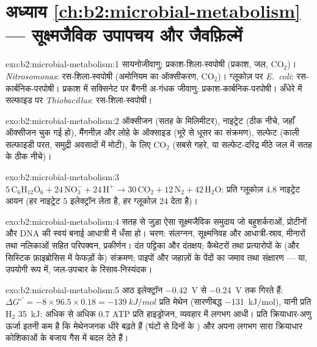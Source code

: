 \section*{अध्याय \ref{ch:b2:microbial-metabolism} --- सूक्ष्मजैविक उपापचय और जैवफ़िल्में}

\begin{solution}{exo:b2:microbial-metabolism:1}
\begingroup\sloppy
सायनोजीवाणु: प्रकाश-शिला-स्वपोषी (प्रकाश, जल, $\mathrm{CO_2}$)।
\emph{Nitrosomonas}: रस-शिला-स्वपोषी (अमोनियम का ऑक्सीकरण,
$\mathrm{CO_2}$)। ग्लूकोज़ पर \emph{E.~coli}: रस-कार्बनिक-परपोषी।
प्रकाश में सक्सिनेट पर बैंगनी अ-गंधक जीवाणु:
प्रकाश-कार्बनिक-परपोषी। अँधेरे में सल्फाइड पर \emph{Thiobacillus}:
रस-शिला-स्वपोषी।
\par\endgroup
\end{solution}

\begin{solution}{exo:b2:microbial-metabolism:2}
ऑक्सीजन (सतह के मिलिमीटर), नाइट्रेट (ठीक नीचे, जहाँ ऑक्सीजन चुक गई
हो), मैंगनीज़ और लोहे के ऑक्साइड (भूरे से धूसर का संक्रमण), सल्फेट
(काली सल्फाइडी परत, समुद्री अवसादों में मोटी),  के लिए
$\mathrm{CO_2}$ (सबसे गहरे, या सल्फेट-दरिद्र मीठे जल में सतह के ठीक
नीचे)।
\end{solution}

\begin{solution}{exo:b2:microbial-metabolism:3}
$5\,\mathrm{C_6H_{12}O_6} + 24\,\mathrm{NO_3^-} + 24\,\mathrm{H^+}
\to 30\,\mathrm{CO_2} + 12\,\mathrm{N_2} + 42\,\mathrm{H_2O}$: प्रति
ग्लूकोज़ 4.8 नाइट्रेट आयन (हर नाइट्रेट 5 इलेक्ट्रॉन लेता है, हर
ग्लूकोज़ 24 देता है)।
\end{solution}

\begin{solution}{exo:b2:microbial-metabolism:4}
सतह से जुड़ा ऐसा सूक्ष्मजैविक समुदाय जो बहुशर्कराओं, प्रोटीनों और DNA
की स्वयं बनाई आधात्री में धँसा हो। चरण: संलग्नन, सूक्ष्मनिवह और
आधात्री-स्राव, मीनारों तथा नलिकाओं सहित परिपक्वन, प्रकीर्णन। दंत
पट्टिका और दंतक्षय; कैथेटरों तथा प्रत्यारोपों के (और सिस्टिक फ़ाइब्रोसिस
में फेफड़ों के) संक्रमण; पाइपों और जहाज़ों के पेंदों का जमाव तथा
संक्षारण --- या, उपयोगी रूप में, जल-उपचार के रिसाव-निस्यंदक।
\end{solution}

\begin{solution}{exo:b2:microbial-metabolism:5}
आठ इलेक्ट्रॉन \qty{-0.42}{V} से \qty{-0.24}{V} तक गिरते हैं:
$\Delta G^{\circ\prime} = -8\times 96.5\times 0.18 =
\qty{-139}{kJ/mol}$ प्रति मेथेन (सारणीबद्ध \qty{-131}{kJ/mol}), यानी
प्रति $\mathrm{H_2}$ \qty{35}{kJ}: अधिक से अधिक 0.7 ATP प्रति
हाइड्रोजन, व्यवहार में लगभग आधी। प्रति क्रियाधार-अणु ऊर्जा इतनी कम है
कि मेथेनजनक धीरे बढ़ते हैं (घंटों से दिनों के ) और
अपना लगभग सारा क्रियाधार कोशिकाओं के बजाय गैस में बदल देते हैं।
\end{solution}

